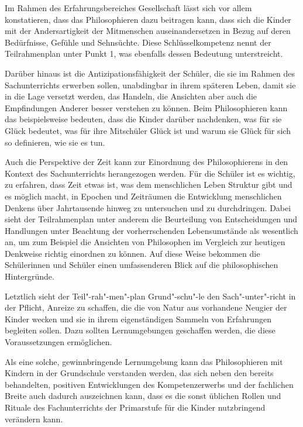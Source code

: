 Im Rahmen des Erfahrungsbereiches \glqq Gesellschaft\grqq{} lässt sich vor allem konstatieren, dass das Philosophieren dazu beitragen kann, dass sich die Kinder mit der Andersartigkeit der Mitmenschen auseinandersetzen in Bezug auf deren Bedürfnisse, Gefühle und Sehnsüchte. 
Diese Schlüsselkompetenz nennt der Teilrahmenplan unter Punkt 1, was ebenfalls dessen Bedeutung unterstreicht. 

Darüber hinaus ist die Antizipationsfähigkeit der Schüler, die sie im Rahmen des Sachunterrichts erwerben sollen, unabdingbar in ihrem späteren Leben, damit sie in die Lage versetzt werden, das Handeln, die Ansichten aber auch die Empfindungen Anderer besser verstehen zu können. 
Beim Philosophieren kann das beispielsweise bedeuten, dass die Kinder darüber nachdenken, was für sie Glück bedeutet, was für ihre Mitschüler Glück ist und warum sie Glück für sich so definieren, wie sie es tun. 

Auch die Perspektive der Zeit kann zur Einordnung des Philosophierens in den Kontext des Sachunterrichts herangezogen werden. 
Für die Schüler ist es wichtig, zu erfahren, dass Zeit etwas ist, was dem menschlichen Leben Struktur gibt und es möglich macht, in Epochen und Zeiträumen die Entwicklung menschlichen Denkens über Jahrtausende hinweg zu untersuchen und zu durchdringen. 
Dabei sieht der Teilrahmenplan unter anderem die \glqq Beurteilung von Entscheidungen und Handlungen\grqq{}\cite[S.\,15]{MBFJ06} unter Beachtung der vorherrschenden Lebensumstände als wesentlich an, um zum Beispiel die Ansichten von Philosophen im Vergleich zur heutigen Denkweise richtig einordnen zu können. 
Auf diese Weise bekommen die Schülerinnen und Schüler einen umfassenderen Blick auf die philosophischen Hintergründe.

Letztlich sieht der Teil"-rah"-men"-plan Grund"-schu"-le den Sach"-unter"-richt in der Pflicht, 
Anreize zu schaffen, die die von Natur aus vorhandene Neugier der Kinder wecken und sie in ihrem eigenständigen Sammeln von Erfahrungen begleiten sollen. 
Dazu sollten Lernumgebungen geschaffen werden, die diese Voraussetzungen ermöglichen. 

Als eine solche, gewinnbringende Lernumgebung kann das Philosophieren mit Kindern in der Grundschule verstanden werden, das sich neben den bereits behandelten, positiven Entwicklungen des Kompetenzerwerbs und der fachlichen Breite
auch dadurch auszeichnen kann, dass es die sonst üblichen Rollen und Rituale des Fachunterrichts der Primarstufe für die Kinder nutzbringend verändern kann.

